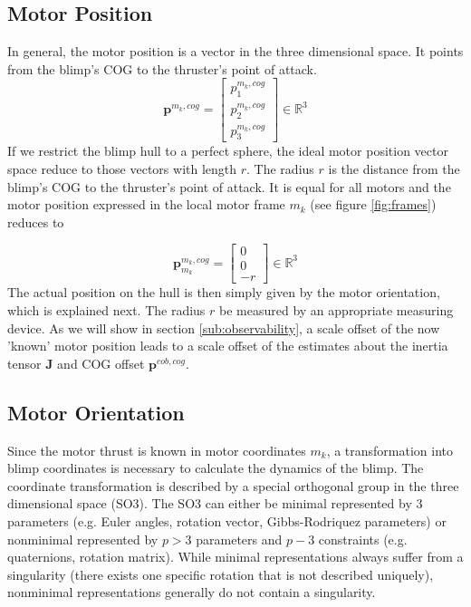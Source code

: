 \subsection{Motor Position}
\label{sub:par_position}
In general, the motor position is a vector in the three dimensional space.
It points from the blimp's COG to the thruster's point of attack.
\begin{equation*}
\mathbf{p}^{m_k,cog}
=
\left[ \begin{array}{c}
p^{m_k,cog}_1 \\
p^{m_k,cog}_2 \\
p^{m_k,cog}_3
\end{array} \right]
\in \mathbb{R}^3
\end{equation*}
If we restrict the blimp hull to a perfect sphere, the ideal motor position vector space reduce to those vectors with length $r$.
The radius $r$ is the distance from the blimp's COG to the thruster's point of attack.
It is equal for all motors and the motor position expressed in the local motor frame $m_k$ (see figure \ref{fig:frames}) reduces to

\begin{equation}
\label{eq:motor_position}
\mathbf{p}^{m_k,cog}_{m_k}
=
\left[ \begin{array}{c}
0 \\
0 \\
-r
\end{array} \right]
\in \mathbb{R}^3
\end{equation}
The actual position on the hull is then simply given by the motor orientation, which is explained next.
The radius $r$ be measured by an appropriate measuring device.
As we will show in section \ref{sub:observability}, a scale offset of the now 'known' motor position leads to a scale offset of the estimates about the inertia tensor $\mathbf{J}$ and COG offset $\mathbf{p}^{cob,cog}$.

\subsection{Motor Orientation}
\label{sub:par_orientation}
Since the motor thrust is known in motor coordinates $m_k$, a transformation into blimp coordinates is necessary to calculate the dynamics of the blimp.
The coordinate transformation is described by a special orthogonal group in the three dimensional space (SO3).
The SO3 can either be minimal represented by $3$ parameters 
(e.g. Euler angles, rotation vector, Gibbs-Rodriquez parameters) 
or nonminimal represented by $p>3$ parameters and $p-3$ constraints 
(e.g. quaternions, rotation matrix).
While minimal representations always suffer from a singularity (there exists one specific rotation that is not described uniquely), nonminimal representations generally do not contain a singularity.
\\

